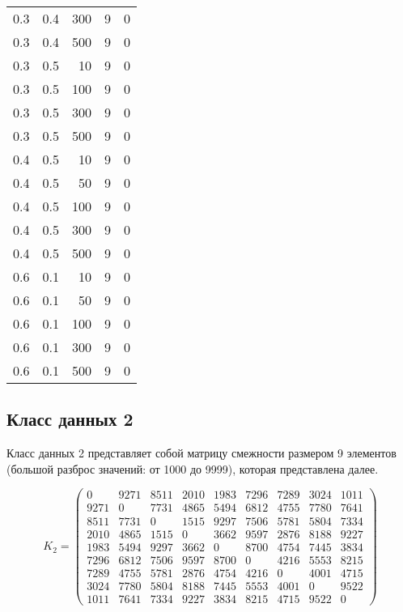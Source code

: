 \begin{center}
\begin{longtable}[c]{|r|r|r|r|r|}
		0.3 & 0.4 & 300 &    9 &    0 \\
		0.3 & 0.4 & 500 &    9 &    0 \\ \hline
		0.3 & 0.5 &  10 &    9 &    0 \\
		0.3 & 0.5 & 100 &    9 &    0 \\
		0.3 & 0.5 & 300 &    9 &    0 \\
		0.3 & 0.5 & 500 &    9 &    0 \\ \hline
		0.4 & 0.5 &  10 &    9 &    0 \\
		0.4 & 0.5 &  50 &    9 &    0 \\
		0.4 & 0.5 & 100 &    9 &    0 \\
		0.4 & 0.5 & 300 &    9 &    0 \\
		0.4 & 0.5 & 500 &    9 &    0 \\ \hline
		0.6 & 0.1 &  10 &    9 &    0 \\
		0.6 & 0.1 &  50 &    9 &    0 \\
		0.6 & 0.1 & 100 &    9 &    0 \\
		0.6 & 0.1 & 300 &    9 &    0 \\
		0.6 & 0.1 & 500 &    9 &    0 \\ \hline
	\end{longtable}
\end{center}

\subsection{Класс данных 2}
\label{par:class2}

Класс данных 2 представляет собой матрицу смежности размером 9 элементов (большой разброс значений: от 1000 до 9999), которая представлена
далее.

\begin{equation}
	\label{eqт:kd2}
	K_{2} = \begin{pmatrix}
		0 & 9271 & 8511 & 2010 & 1983 & 7296 & 7289 & 3024 & 1011 \\
		9271 & 0 & 7731 & 4865 & 5494 & 6812 & 4755 & 7780 & 7641 \\
		8511 & 7731 & 0 & 1515 & 9297 & 7506 & 5781 & 5804 & 7334 \\
		2010 & 4865 & 1515 & 0 & 3662 & 9597 & 2876 & 8188 & 9227 \\
		1983 & 5494 & 9297 & 3662 & 0 & 8700 & 4754 & 7445 & 3834 \\
		7296 & 6812 & 7506 & 9597 & 8700 & 0 & 4216 & 5553 & 8215 \\
		7289 & 4755 & 5781 & 2876 & 4754 & 4216 & 0 & 4001 & 4715 \\
		3024 & 7780 & 5804 & 8188 & 7445 & 5553 & 4001 & 0 & 9522 \\
		1011 & 7641 & 7334 & 9227 & 3834 & 8215 & 4715 & 9522 & 0 
	\end{pmatrix}
\end{equation}

